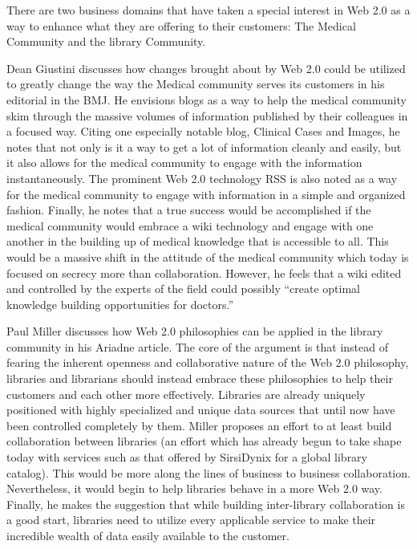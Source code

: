 There are two business domains that have taken a special interest in Web 2.0 as
a way to enhance what they are offering to their customers: The Medical
Community and the library Community.

Dean Giustini \citeyearpar{giustini2006} discusses how changes brought about by
Web 2.0 could be utilized to greatly change the way the Medical community serves
its customers in his editorial in the BMJ.  He envisions blogs as a way to help
the medical community skim through the massive volumes of information published
by their colleagues in a focused way.  Citing one especially notable blog,
Clinical Cases and Images, he notes that not only is it a way to get a lot of
information cleanly and easily, but it also allows for the medical community to
engage with the information instantaneously.  The prominent Web 2.0 technology
RSS is also noted as a way for the medical community to engage with information
in a simple and organized fashion.  Finally, he notes that a true success would
be accomplished if the medical community would embrace a wiki technology and
engage with one another in the building up of medical knowledge that is
accessible to all.  This would be a massive shift in the attitude of the medical
community which today is focused on secrecy more than collaboration.  However,
he feels that a wiki edited and controlled by the experts of the field could
possibly ``create optimal knowledge building opportunities for doctors.''

Paul Miller \citeyearpar{miller2005} discusses how Web 2.0 philosophies can be
applied in the library community in his Ariadne article.  The core of the
argument is that instead of fearing the inherent openness and collaborative
nature of the Web 2.0 philosophy, libraries and librarians should instead
embrace these philosophies to help their customers and each other more
effectively.  Libraries are already uniquely positioned with highly specialized
and unique data sources that until now have been controlled completely by them.
Miller proposes an effort to at least build collaboration between libraries (an
effort which has already begun to take shape today with services such as that
offered by SirsiDynix for a global library catalog).  This would be more along
the lines of business to business collaboration.  Nevertheless, it would begin
to help libraries behave in a more Web 2.0 way.  Finally, he makes the
suggestion that while building inter-library collaboration is a good start,
libraries need to utilize every applicable service to make their incredible
wealth of data easily available to the customer.

